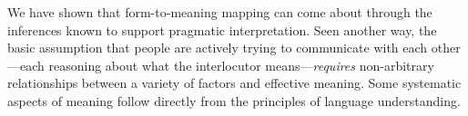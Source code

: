 \documentclass[10pt,letterpaper]{article}
\newcommand{\w}[1]{\emph{#1}}
\newcommand{\todo}[1]{{\color{red}#1}}
\begin{document}

We have shown that form-to-meaning mapping can come about through the inferences known to support pragmatic interpretation.
Seen another way, the basic assumption that people are actively trying to communicate with each other---each reasoning about what the interlocutor means---\emph{requires} non-arbitrary relationships between a variety of factors and effective meaning.
Some systematic aspects of meaning follow directly from the principles of language understanding.

\end{document}
